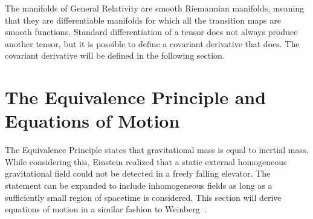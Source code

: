 The manifolds of General Relativity are smooth Riemannian manifolds, meaning that they are differentiable manifolds for which all the transition maps are smooth functions. Standard differentiation of a tensor does not always produce another tensor, but it is possible to define a covariant derivative that does. The covariant derivative will be defined in the following section.

\section{The Equivalence Principle and Equations of Motion}

The Equivalence Principle states that gravitational mass is equal to inertial mass. While considering this, Einstein realized that a static external homogeneous gravitational field could not be detected in a freely falling elevator. The statement can be expanded to include inhomogeneous fields as long as a sufficiently small region of spacetime is considered. This section will derive equations of motion in a similar fashion to Weinberg~\cite{weinberg1972gravitation}.

